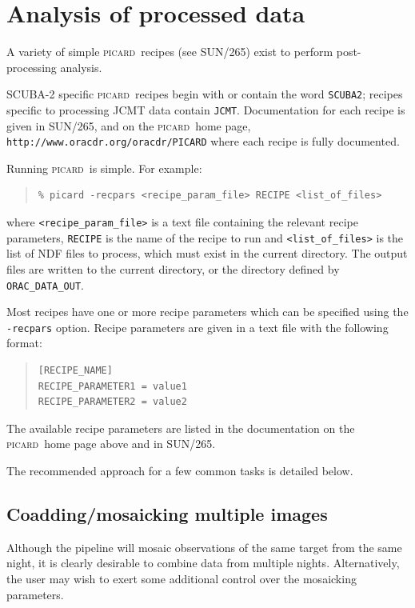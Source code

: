 \documentclass[twoside,11pt]{article}
\newcommand{\htmladdnormallink}[2]{#1}
\newcommand{\xref}[3]{#1}
\newcommand{\xlabel}[1]{}
\renewcommand{\_}{\texttt{\symbol{95}}}
\newenvironment{myquote}{\begin{quote}\begin{small}}{\end{small}\end{quote}}
\newcommand{\picard}{\textsc{picard}}
\newcommand{\picardsun}{\xref{SUN/265}{sun265}{}}
\begin{document}
\section{\xlabel{picard}Analysis of processed data\label{picard}}

A variety of simple \picard\ recipes (see \picardsun) exist to perform
post-processing analysis.

SCUBA-2 specific \picard\ recipes begin with or contain the word
\verb+SCUBA2+; recipes specific to processing JCMT data contain
\verb+JCMT+. Documentation for each recipe is given in \picardsun, and
on the \picard\ home page,
\htmladdnormallink{\texttt{http://www.oracdr.org/oracdr/PICARD}}{http://www.oracdr.org/oracdr/PICARD}
where each recipe is fully documented.

Running \picard\ is simple. For example:
\begin{myquote}
\begin{verbatim}
% picard -recpars <recipe_param_file> RECIPE <list_of_files>
\end{verbatim}
\end{myquote}
where \verb+<recipe_param_file>+ is a text file containing the
relevant recipe parameters, \verb+RECIPE+ is the name of the
recipe to run and \verb+<list_of_files>+ is the list of NDF files to
process, which must exist in the current directory. The output files
are written to the current directory, or the directory defined by
\verb+ORAC_DATA_OUT+.

Most recipes have one or more recipe parameters which can be specified
using the \texttt{-recpars} option. Recipe parameters are given in a
text file with the following format:
\begin{myquote}
\begin{verbatim}
[RECIPE_NAME]
RECIPE_PARAMETER1 = value1
RECIPE_PARAMETER2 = value2
\end{verbatim}
\end{myquote}
The available recipe parameters are listed in the documentation on the
\picard\ home page above and in \picardsun.

The recommended approach for a few common tasks is detailed below.

\subsection{Coadding/mosaicking multiple images}

Although the pipeline will mosaic observations of the same target from
the same night, it is clearly desirable to combine data from multiple
nights. Alternatively, the user may wish to exert some additional
control over the mosaicking parameters.
\end{document}
